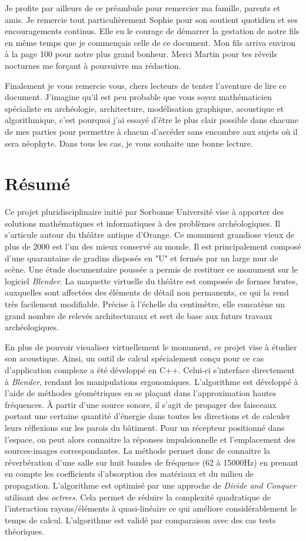 Je profite par ailleurs de ce préambule pour remercier ma famille, parents et amis. Je remercie tout particulièrement Sophie pour son soutient quotidien et ses encouragements continus. Elle eu le courage de démarrer la gestation de notre fils en même temps que je commençais celle de ce document. Mon fils arriva environ à la page 100 pour notre plus grand bonheur. Merci Martin pour tes réveils nocturnes me forçant à poursuivre ma rédaction.

Finalement je vous remercie vous, chers lecteurs de tenter l'aventure de lire ce document. J'imagine qu'il est peu probable que vous soyez mathématicien spécialiste en archéologie, architecture, modélisation graphique, acoustique et algorithmique, c'est pourquoi j'ai essayé d'être le plus clair possible dans chacune de mes parties pour permettre à chacun d'accéder sans encombre aux sujets où il sera néophyte. Dans tous les cas, je vous souhaite une bonne lecture.


\newpage
\chapter*{Résumé}
Ce projet pluridisciplinaire initié par Sorbonne Université vise à apporter des solutions mathématiques et informatiques à des problèmes archéologiques. Il s'articule autour du théâtre antique d'Orange. Ce monument grandiose vieux de plus de 2000 est l'un des mieux conservé au monde. Il est principalement composé d'une quarantaine de gradins disposés en "U" et fermés par un large mur de scène. Une étude documentaire poussée a permis de restituer ce monument sur le logiciel \textit{Blender}. La maquette virtuelle du théâtre est composée de formes brutes, auxquelles sont affectées des éléments de détail non permanents, ce qui la rend très facilement modifiable. Précise à l'échelle du centimètre, elle concatène un grand nombre de relevés architecturaux et sert de base aux futurs travaux archéologiques.

 En plus de pouvoir visualiser virtuellement le monument, ce projet vise à étudier son acoustique. Ainsi, un outil de calcul spécialement conçu pour ce cas d'application complexe a été développé en C++. Celui-ci s'interface directement à \textit{Blender}, rendant les manipulations ergonomiques. L'algorithme est développé à l'aide de méthodes géométriques en se plaçant dans l'approximation hautes fréquences. À partir d'une source sonore, il s'agit de propager des faisceaux portant une certaine quantité d'énergie dans toutes les directions et de calculer leurs réflexions sur les parois du bâtiment. Pour un récepteur positionné dans l'espace, on peut alors connaitre la réponses impulsionnelle et l'emplacement des sources-images correspondantes. La méthode permet donc de connaitre la réverbération d'une salle sur huit bandes de fréquence (62 à 15000Hz) en prenant en compte les coefficients d'absorption des matériaux et du milieu de propagation. L'algorithme est optimisé par une approche de \textit{Divide and Conquer} utilisant des \textit{octrees}. Cela permet de réduire la complexité quadratique de l'interaction rayons/éléments à quasi-linéaire ce qui améliore considérablement le temps de calcul. L'algorithme est validé par comparaison avec des cas tests théoriques.
 
